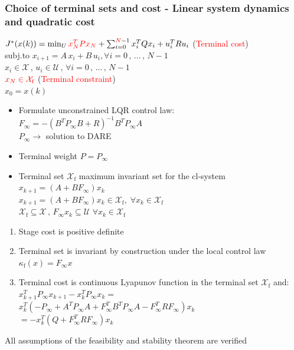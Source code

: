 \subsubsection{Choice of terminal sets and cost - Linear system dynamics and quadratic cost}
$J^*(x(k))=\min_U\textcolor{red}{x_N^TPx_N}+\sum_{i=0}^{\textcolor{red}{N}-1}x_i^TQx_i+u_i^TRu_i$ (\textcolor{red}{Terminal cost})\\
subj.to  $x_{i+1}=A\,x_i+B\,u_i, \forall i=0\,,\,...\,,\,N-1$\\
$x_i\in\mathcal{X}\,,\,u_i\in\mathcal{U}\,,\,\forall i=0\,,\,...\,,\,N-1$\\
$\textcolor{red}{x_N\in\mathcal{X}_\text{f}}$ (\textcolor{red}{Terminal constraint})\\
$x_0=x(k)$\\
\begin{itemize}
    \item Formulate unconstrained LQR control law:\\
    $F_\infty=-(B^TP_\infty B+R)^{-1}B^TP_\infty A$\\
    $P_\infty \rightarrow $ solution to DARE
    \item Terminal weight $P=P_\infty$
    \item Terminal set $\mathcal{X}_\text{f}$ maximum invariant set for the cl-system $x_{k+1}=(A+BF_\infty)x_k$\\
    $x_{k+1}=(A+BF_\infty)x_k\in\mathcal{X}_\text{f},\;\forall x_k\in \mathcal{X}_\text{f}$\\
    $\mathcal{X}_\text{f}\subseteq\mathcal{X}\,,\, F_\infty x_k\subseteq\mathcal{U}\,\,\forall x_k\in\mathcal{X}_\text{f}$
\end{itemize}
\begin{enumerate}
    \item Stage cost is positive definite
    \item Terminal set is invariant by construction under the local control law $\kappa_\text{f}(x)=F_\infty x$
    \item Terminal cost is continuous Lyapunov function in the terminal set $\mathcal{X}_\text{f}$ and:\\
    $x_{k+1}^TP_\infty x_{k+1}-x_k^TP_\infty x_k=$\\
    $x_k^T(-P_\infty+A^TP_\infty A+F_\infty^TB^TP_\infty A-F_\infty^TRF_\infty)x_k$\\
    $=-x_k^T(Q+F_\infty^TRF_\infty)x_k$
\end{enumerate}
\rightarrow All assumptions of the feasibility and stability theorem are verified\\


